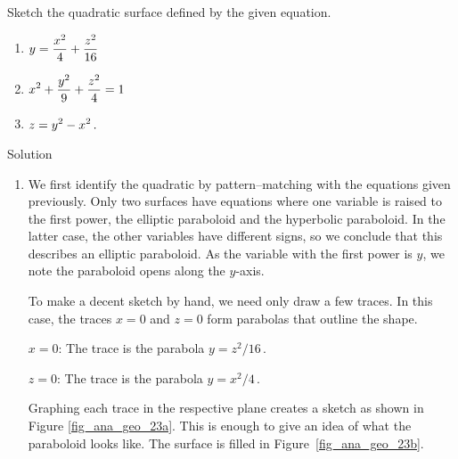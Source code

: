 \ifcalculus\pagebreak\fi
\begin{example}\label{ex_space5}
Sketch the quadratic surface defined by the given equation.\\[5pt]
\begin{multicols}{3}
\begin{enumerate}[align=left]
    \item $\displaystyle y=\frac{x^2}{4}+\frac{z^2}{16}$ \item $\displaystyle x^2+\frac{y^2}{9}+\frac{z^2}{4}=1$ 
    \item $\displaystyle z=y^2-x^2\,.$
    \end{enumerate}
\end{multicols}

Solution 

\begin{enumerate}[align=left]
	\item 	We first identify the quadratic by pattern--matching with the equations given previously. Only two surfaces have equations where one variable is raised to the first power, the elliptic paraboloid and the hyperbolic paraboloid. In the latter case, the other variables have different signs, so we conclude that this describes an elliptic paraboloid. As the variable with the first power is $y$, we note the paraboloid opens along the $y$-axis. 
	
	To make a decent sketch by hand, we need only draw a few traces. In this case, the traces $x=0$ and $z=0$ form parabolas that outline the shape.
	
	$x=0$:	The trace is the parabola $y=z^2/16\,.$
	
	$z=0$: 	The trace is the parabola $y=x^2/4\,.$
	
	Graphing each trace in the respective plane creates a sketch as shown in Figure \ref{fig_ana_geo_23a}. This is enough to give an idea of what the paraboloid looks like. The surface is filled in Figure~\ref{fig_ana_geo_23b}.
	

\end{enumerate}
\end{example}
